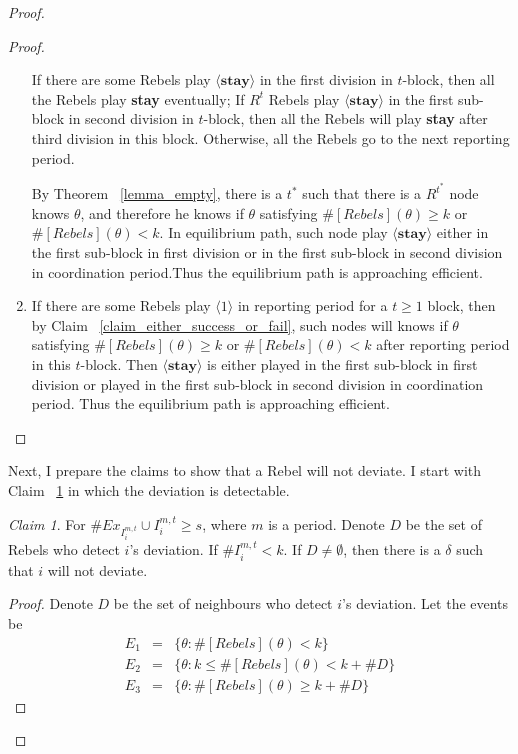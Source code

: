 \documentclass[12pt,letter]{article}
\theoremstyle{definition}
\theoremstyle{remark}
\theoremstyle{claim}
\newtheorem{claim}{Claim}
\begin{document}
\begin{proof}
\begin{proof}
\begin{enumerate}
If there are some Rebels play $\langle \textbf{stay} \rangle$ in the first division in $t$-block, then all the Rebels play \textbf{stay} eventually; If $R^t$ Rebels play $\langle \textbf{stay} \rangle$ in the first sub-block in second division in $t$-block, then all the Rebels will play \textbf{stay} after third division in this block. Otherwise, all the Rebels go to the next reporting period.

By Theorem ~\ref{lemma_empty}, there is a $t^{*}$ such that there is a $R^{t^{*}}$ node knows $\theta$, and therefore he knows if $\theta$ satisfying $\#[Rebels](\theta)\geq k$ or $\#[Rebels](\theta)< k$. In equilibrium path, such node play $\langle \textbf{stay} \rangle$ either in the first sub-block in first division or in the first sub-block in second division in coordination period.Thus the equilibrium path is approaching efficient.

\item If there are some Rebels play $\langle 1 \rangle$ in reporting period for a $t\geq 1$ block, then by Claim ~\ref{claim_either_success_or_fail}, such nodes will knows if $\theta$ satisfying $\#[Rebels](\theta)\geq k$ or $\#[Rebels](\theta)< k$ after reporting period in this $t$-block. Then $\langle \textbf{stay} \rangle$ is either played in the first sub-block in first division or played in the first sub-block in second division in coordination period. Thus the equilibrium path is approaching efficient.

 
\end{enumerate}

\end{proof}



Next, I prepare the claims to show that a Rebel will not deviate. I start with Claim ~\ref{claim_detection_reporting_period} in which the deviation is detectable.


\begin{claim} 
\label{claim_detection_reporting_period}
For $\#Ex_{I^{m,t}_i}\cup I^{m,t}_i\geq s$, where $m$ is a period. Denote $D$ be the set of Rebels who detect $i$'s deviation. If $\# I^{m,t}_i<k$. If $D\neq \emptyset$, then there is a $\delta$ such that $i$ will not deviate.
\end{claim}
\begin{proof}

Denote $D$ be the set of neighbours who detect $i$'s deviation. Let the events be
\begin{eqnarray*}
E_1 	&= &\{\theta: \#[Rebels](\theta)< k\}\\
E_2 	&= &\{\theta: k\leq \#[Rebels](\theta)<k+\# D\}\\
E_3 	&= &\{\theta: \#[Rebels](\theta)\geq k+\# D\}
\end{eqnarray*}


\end{proof}
\end{proof}
\end{document}
